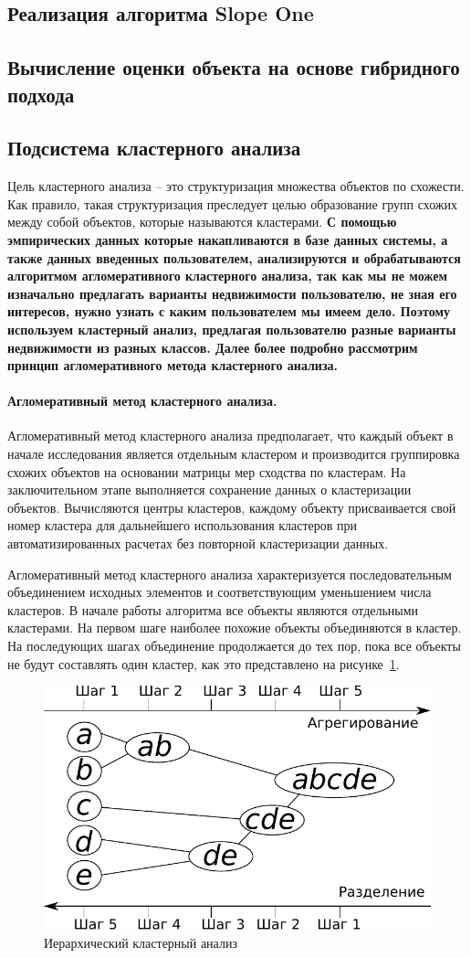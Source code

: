 \documentclass[a4paper,14pt,openany,final]{extreport} %
\def\oldcaption{} \let\oldcaption=\caption
\def\caption{\stepcounter{captionsnum}\oldcaption}
\begin{document}
\subsection{Реализация алгоритма Slope One}
\subsection{Вычисление оценки объекта на основе гибридного подхода}
\subsection{Подсистема кластерного анализа}

Цель кластерного анализа -- это структуризация множества объектов по схожести. Как правило, такая структуризация преследует целью образование групп схожих между собой объектов, которые называются кластерами. \textbf{С помощью эмпирических данных которые накапливаются в базе данных системы, а также данных введенных пользователем, анализируются и обрабатываются алгоритмом агломеративного кластерного анализа, так как мы не можем изначально предлагать варианты недвижимости пользователю, не зная его интересов, нужно узнать с каким пользователем мы имеем дело. Поэтому используем кластерный анализ, предлагая пользователю разные варианты недвижимости из разных классов. Далее более подробно рассмотрим принцип агломеративного метода кластерного анализа.}

\paragraph{Агломеративный метод кластерного анализа.}
Агломеративный метод кластерного анализа предполагает, что каждый объект в начале исследования является отдельным кластером и производится группировка схожих объектов на основании матрицы мер сходства по кластерам. На заключительном этапе выполняется сохранение данных о кластеризации объектов. Вычисляются центры кластеров, каждому объекту присваивается свой номер кластера для дальнейшего использования кластеров при автоматизированных расчетах без повторной кластеризации данных.

Агломеративный метод кластерного анализа характеризуется последовательным объединением исходных элементов и соответствующим уменьшением числа кластеров. В начале работы алгоритма все объекты являются отдельными кластерами. На первом шаге наиболее похожие объекты объединяются в кластер. На последующих шагах объединение продолжается до тех пор, пока все объекты не будут составлять один кластер, как это представлено на рисунке~\ref{fig:hclustdescr}.
\begin{figure}[htbp]
  \centering
  \includegraphics[width=0.5\linewidth]{hclustexp.pdf}
  \caption{Иерархический кластерный анализ}
  \label{fig:hclustdescr}
\end{figure}
\end{document}
